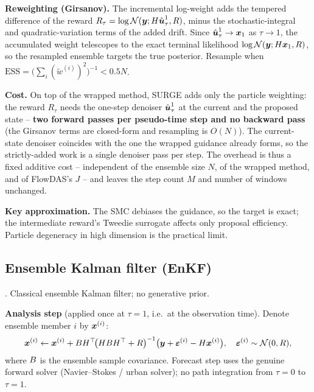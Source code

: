 \textbf{Reweighting (Girsanov).}
The incremental log-weight adds the tempered difference of the reward $R_\tau=\log\mathcal{N}(\boldsymbol{y};H\hat{\boldsymbol{u}}^1_\tau,R)$, minus the stochastic-integral and quadratic-variation terms of the added drift.
Since $\hat{\boldsymbol{u}}^1_\tau\to\boldsymbol{x}_1$ as $\tau\to1$, the accumulated weight telescopes to the exact terminal likelihood $\log\mathcal{N}(\boldsymbol{y};H\boldsymbol{x}_1,R)$, so the resampled ensemble targets the true posterior.
Resample when $\mathrm{ESS} = \bigl(\sum_i (\tilde{w}^{(i)})^{2}\bigr)^{-1} < 0.5N$.

\textbf{Cost.}
On top of the wrapped method, SURGE adds only the particle weighting: the reward $R_\tau$ needs the one-step denoiser $\hat{\boldsymbol{u}}^1_\tau$ at the current and the proposed state -- \textbf{two forward passes per pseudo-time step and no backward pass} (the Girsanov terms are closed-form and resampling is $O(N)$). The current-state denoiser coincides with the one the wrapped guidance already forms, so the strictly-added work is a single denoiser pass per step. The overhead is thus a fixed additive cost -- independent of the ensemble size $N$, of the wrapped method, and of FlowDAS's $J$ -- and leaves the step count $M$ and number of windows unchanged.

\textbf{Key approximation.}
The SMC debiases the guidance, so the target is exact; the intermediate reward's Tweedie surrogate affects only proposal efficiency. Particle degeneracy in high dimension is the practical limit.

\subsection{Ensemble Kalman filter (EnKF)}\label{appendix:method:enkf}

\cite{evensen_data_2022}. Classical ensemble Kalman filter; no generative prior.

\textbf{Analysis step} (applied once at $\tau=1$, i.e.\ at the observation time).
Denote ensemble member $i$ by $\boldsymbol{x}^{(i)}$:
\begin{align}
  \boldsymbol{x}^{(i)} \leftarrow \boldsymbol{x}^{(i)}
  + BH^\top\!\bigl(HBH^\top+R\bigr)^{-1}
    \bigl(\boldsymbol{y} + \boldsymbol\varepsilon^{(i)} - H\boldsymbol{x}^{(i)}\bigr),
  \quad \boldsymbol\varepsilon^{(i)}\sim\mathcal{N}(0,R),
\end{align}
where $B$ is the ensemble sample covariance. Forecast step uses the genuine forward solver (Navier--Stokes / urban solver); no path integration from $\tau=0$ to $\tau=1$.

